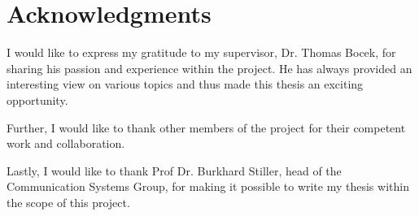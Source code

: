 \chapter*{Acknowledgments}

I would like to express my gratitude to my supervisor, Dr. Thomas Bocek, for sharing his passion and experience within the project. He has always provided an interesting view on various topics and thus made this thesis an exciting opportunity.

Further, I would like to thank other members of the project for their competent work and collaboration.

Lastly, I would like to thank Prof Dr. Burkhard Stiller, head of the Communication Systems Group, for making it possible to write my thesis within the scope of this project.
